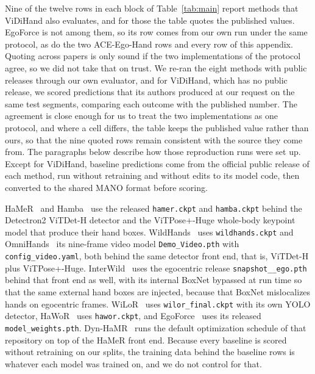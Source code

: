 \documentclass[10pt,twocolumn,letterpaper]{article}
\newcommand{\method}{ACE-Ego-Hand} %
\begin{document}
Nine of the twelve rows in each block of Table~\ref{tab:main} report methods that ViDiHand also evaluates, and for those the table quotes the published values. EgoForce is not among them, so its row comes from our own run under the same protocol, as do the two \method{} rows and every row of this appendix. Quoting across papers is only sound if the two implementations of the protocol agree, so we did not take that on trust. We re-ran the eight methods with public releases through our own evaluator, and for ViDiHand, which has no public release, we scored predictions that its authors produced at our request on the same test segments, comparing each outcome with the published number. The agreement is close enough for us to treat the two implementations as one protocol, and where a cell differs, the table keeps the published value rather than ours, so that the nine quoted rows remain consistent with the source they come from. The paragraphs below describe how those reproduction runs were set up. Except for ViDiHand, baseline predictions come from the official public release of each method, run without retraining and without edits to its model code, then converted to the shared MANO format before scoring. 

HaMeR~\citep{hamer2024} and Hamba~\citep{hamba2024} use the released \texttt{hamer.\allowbreak ckpt} and \texttt{hamba.\allowbreak ckpt} behind the Detectron2 ViTDet-H detector and the ViTPose+-Huge whole-body keypoint model that produce their hand boxes. WildHands~\citep{wildhands2024} uses \texttt{wildhands.\allowbreak ckpt} and OmniHands~\citep{omnihands2025} its nine-frame video model \texttt{Demo\_\allowbreak Video.\allowbreak pth} with \texttt{config\_\allowbreak video.\allowbreak yaml}, both behind the same detector front end, that is, ViTDet-H plus ViTPose+-Huge. InterWild~\citep{interwild2023} uses the egocentric release \texttt{snapshot\_\_\allowbreak ego.\allowbreak pth} behind that front end as well, with its internal BoxNet bypassed at run time so that the same external hand boxes are injected, because that BoxNet mislocalizes hands on egocentric frames. WiLoR~\citep{wilor2025} uses \texttt{wilor\_\allowbreak final.\allowbreak ckpt} with its own YOLO detector, HaWoR~\citep{hawor2025} uses \texttt{hawor.\allowbreak ckpt}, and EgoForce~\citep{egoforce2026} uses its released \texttt{model\_\allowbreak weights.\allowbreak pth}. Dyn-HaMR~\citep{dynhamr2025} runs the default optimization schedule of that repository on top of the HaMeR front end. Because every baseline is scored without retraining on our splits, the training data behind the baseline rows is whatever each model was trained on, and we do not control for that.
\end{document}
